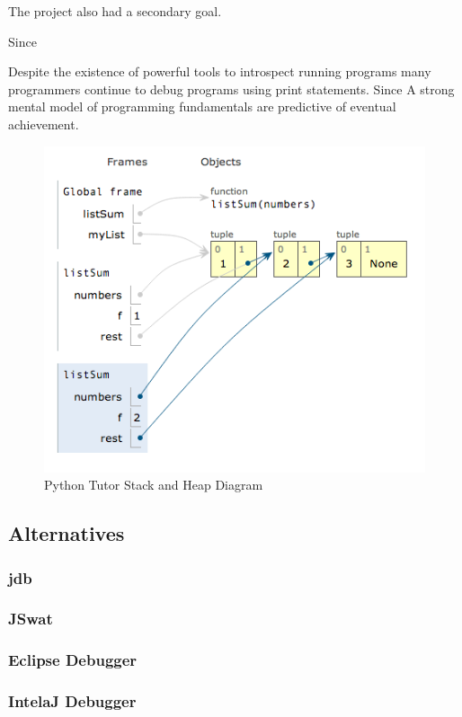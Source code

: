 \documentclass[11pt, a4paper]{article}
\begin{document}
The project also had a secondary goal.

Since 

Despite the existence of powerful tools to introspect running programs many programmers continue to debug programs using print statements.
Since 
A strong mental model of programming fundamentals are predictive of eventual achievement.

\begin{figure}[h!]
\centering
\includegraphics[width=\textwidth]{PythonTutorStackHeap.png}
\caption{Python Tutor Stack and Heap Diagram}
\end{figure}

\subsection{Alternatives}
\subsubsection{jdb}
\subsubsection{JSwat}
\subsubsection{Eclipse Debugger}
\subsubsection{IntelaJ Debugger}
\end{document}
